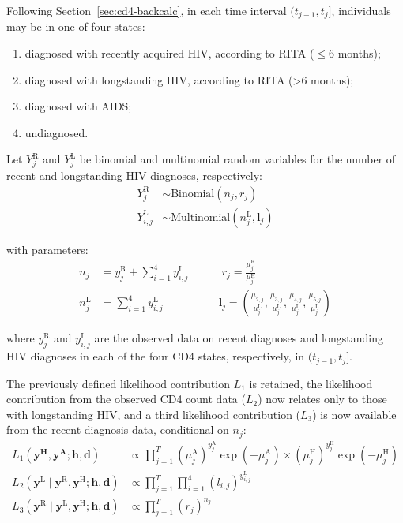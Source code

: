 Following Section~\ref{sec:cd4-backcalc}, in each time interval $(t_{j-1}, t_j]$, individuals may be in one of four states:
%
\begin{enumerate}
  \item diagnosed with recently acquired HIV, according to RITA ($\leq$6 months);
  \item diagnosed with longstanding HIV, according to RITA (>6 months);
  \item diagnosed with AIDS;
  \item undiagnosed.
\end{enumerate}

Let $Y^\text{R}_j$ and $Y^\text{L}_j$ be binomial and multinomial random variables for the number of recent and longstanding HIV diagnoses, respectively:
%
\begin{align*}
  Y^\text{R}_j     & \sim \text {Binomial}(n_j,r_j)                  \\
  Y^\text{L}_{i,j} & \sim \text {Multinomial}(n_j^\text{L},\bm{l}_j)
\end{align*}

with parameters:
%
\begin{align*}
  n_j          & = y^\text{R}_j + \sum_{i=1}^4{y^\text{L}_{i,j}} \quad \quad \quad
  r_j = \frac{\mu^\text{R}_{j}}{\mu_j^\text{H}}                                    \\
  n^\text{L}_j & = \sum_{i=1}^4{y^\text{L}_{i,j}} \quad \quad \quad \quad \quad
  \bm{l}_j =\left(\frac{\mu_{2,j}}{\mu_j^\text{L}},\frac{\mu_{3,j}}{\mu_j^\text{L}},\frac{\mu_{4,j}}{\mu_j^\text{L}},\frac{\mu_{5,j}}{\mu_j^\text{L}}\right)
\end{align*}

where $y^\text{R}_j$ and $y^\text{L}_{i,j}$ are the observed data on recent diagnoses and longstanding HIV diagnoses in each of the four CD4 states, respectively, in $(t_{j-1},t_j]$.

The previously defined likelihood contribution $L_1$ is retained, the likelihood contribution from the observed CD4 count data ($L_2$) now relates only to those with longstanding HIV, and a third likelihood contribution ($L_3$) is now available from the recent diagnosis data, conditional on $n_j$\@:
%
\begin{align*}
  L_1(\bm{y^\text{H}}, \bm{y^\text{A}};\bm{h},\bm{d})                      & \propto \prod_{j=1}^T {(\mu_j^\text{A})}^{y^\text{A}_j}\exp(-\mu_j^\text{A})\times{(\mu_j^\text{H})}^{y^\text{H}_j}\exp(-\mu_j^\text{H}) \\
  L_2(\bm{y}^\text{L} \mid \bm{y}^\text{R}, \bm{y}^\text{H};\bm{h},\bm{d}) & \propto \prod_{j=1}^T \prod_{i=1}^4 {(l_{i,j})}^{y^{\text{L}}_{i,j}}                                                                     \\
  L_3(\bm{y}^\text{R} \mid \bm{y}^\text{L}, \bm{y}^\text{H};\bm{h},\bm{d}) & \propto \prod_{j=1}^T {(r_j)}^{n_j}
\end{align*}

